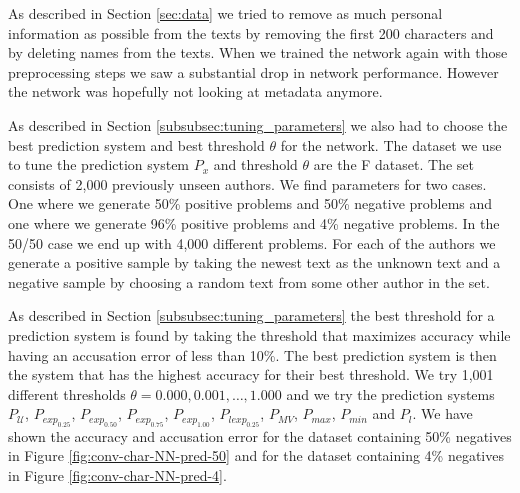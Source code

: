 As described in Section \ref{sec:data} we tried to remove as much personal
information as possible from the texts by removing the first 200 characters and
by deleting names from the texts. When we trained the network again with those
preprocessing steps we saw a substantial drop in network performance. However
the network was hopefully not looking at metadata anymore.

As described in Section \ref{subsubsec:tuning_parameters} we also had to choose
the best prediction system and best threshold $\theta$ for the network. The
dataset we use to tune the prediction system $P_x$ and threshold $\theta$ are
the \gls{F} dataset. The set consists of 2,000 previously unseen authors. We
find parameters for two cases. One where we generate 50\% positive problems and
50\% negative problems and one where we generate 96\% positive problems and 4\%
negative problems. In the 50/50 case we end up with 4,000 different problems.
For each of the authors we generate a positive sample by taking the newest text
as the unknown text and a negative sample by choosing a random text from some
other author in the set.

As described in Section \ref{subsubsec:tuning_parameters} the best threshold
for a prediction system is found by taking the threshold that maximizes
accuracy while having an accusation error of less than 10\%. The best
prediction system is then the system that has the highest accuracy for
their best threshold. We try 1,001 different thresholds $\theta = 0.000,
0.001, \dots, 1.000$ and we try the prediction systems $P_\mathcal{U}$,
$P_{exp_{0.25}}$, $P_{exp_{0.50}}$, $P_{exp_{0.75}}$, $P_{exp_{1.00}}$,
$P_{lexp_{0.25}}$, $P_{MV}$, $P_{max}$, $P_{min}$ and $P_l$. We have shown
the accuracy and accusation error for the dataset containing 50\% negatives
in Figure \ref{fig:conv-char-NN-pred-50} and for the dataset containing 4\%
negatives in Figure \ref{fig:conv-char-NN-pred-4}.

